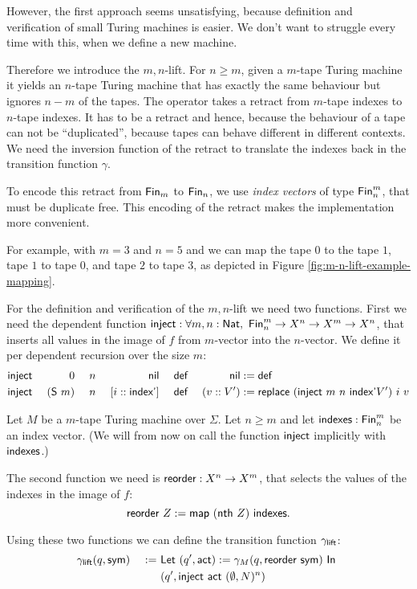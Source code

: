 \documentclass{psartcl}
\begin{document}
However, the first approach seems unsatisfying, because definition and verification of small Turing machines is easier.  We don't want to struggle
every time with this, when we define a new machine.

Therefore we introduce the $m,n$-lift. For $n \ge m$, given a $m$-tape Turing machine it yields an $n$-tape Turing machine that has exactly the
same behaviour but ignores $n-m$ of the tapes.  The operator takes a retract from $m$-tape indexes to $n$-tape indexes.  It has to be a retract and
hence, because the behaviour of a tape can not be ``duplicated'', because tapes can behave different in different contexts.  We need the inversion
function of the retract to translate the indexes back in the transition function $\gamma$.

To encode this retract from $\textsf{Fin}_m$ to $\textsf{Fin}_n$, we use \emph{index vectors} of type $\textsf{Fin}_n^m$, that must be duplicate free.  This encoding of the retract makes the implementation more convenient.

For example, with $m=3$ and $n=5$ and we can  map the tape $0$ to the tape $1$, tape $1$ to tape $0$, and tape $2$ to tape $3$, as depicted in Figure
\ref{fig:m-n-lift-example-mapping}.

For the definition and verification of the $m,n$-lift we need two functions.
First we need the dependent function
$\textsf{inject} : \forall m, n:\textsf{Nat},~\textsf{Fin}_n^m \rightarrow X^n \rightarrow X^m \rightarrow X^n$,
that inserts all values in the image of $f$ from $m$-vector into the $n$-vector.  We define it per dependent recursion over the size $m$:
\begin{alignat*}{6}
  \textsf{inject}&&~ 0         && ~ n &&~ \textsf{nil}                &&~ \textsf{def} &&~ \textsf{nil}      &:= \textsf{def} \\
  \textsf{inject}&&~ (\textsf{S}~m) && ~ n &&~ [i :: \textsf{index'}]  &&~ \textsf{def} &&~ (v :: V') &:= \textsf{replace}~(\textsf{inject}~m~n~\textsf{index'} V')~i~v
\end{alignat*}

Let $M$ be a $m$-tape Turing machine over $\Sigma$.  Let $n \ge m$ and let $\textsf{indexes}:\textsf{Fin}_n^m$ be an index vector.
(We will from now on call the function $\textsf{inject}$ implicitly with $\textsf{indexes}$.)

The second function we need is $\textsf{reorder} : X^n \rightarrow X^m$, that selects the values of the indexes in the image of $f$:
$$\textsf{reorder}~Z := \textsf{map}~(\textsf{nth}~Z)~\textsf{indexes}.$$

Using these two functions we can define the transition function $\gamma_{\textsf{lift}}$:
\begin{alignat*}{3}
  &\gamma_{\textsf{lift}} (q, \textsf{sym})  &~:=~& \textsf{Let}~(q', \textsf{act}) := \gamma_M(q, \textsf{reorder}~\textsf{sym})~\textsf{In}~\\
  &                                  &~  ~& (q',\textsf{inject}~\textsf{act}~(\emptyset, N)^n)
\end{alignat*}
\end{document}
